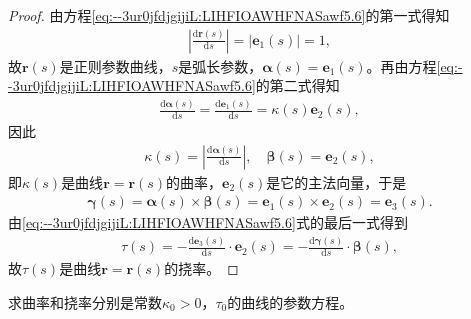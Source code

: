 \documentclass[../../main.tex]{subfiles}%
\begin{document}
\begin{proof}
由方程\eqref{eq:--3ur0jfdjgijiL:LIHFIOAWHFNASawf5.6}的第一式得知
\begin{align*}
\left|\frac{\mathrm{d}\bm{r}(s)}{\mathrm{d}s}\right| = |\bm{e}_1(s)| = 1,
\end{align*}
故$\bm{r}(s)$是正则参数曲线，$s$是弧长参数，$\bm{\alpha}(s) = \bm{e}_1(s)$。再由方程\eqref{eq:--3ur0jfdjgijiL:LIHFIOAWHFNASawf5.6}的第二式得知
\begin{align*}
\frac{\mathrm{d}\bm{\alpha}(s)}{\mathrm{d}s} = \frac{\mathrm{d}\bm{e}_1(s)}{\mathrm{d}s} = \kappa(s)\bm{e}_2(s),
\end{align*}
因此
\begin{align*}
\kappa(s) = \left|\frac{\mathrm{d}\bm{\alpha}(s)}{\mathrm{d}s}\right|,\quad \bm{\beta}(s) = \bm{e}_2(s),
\end{align*}
即$\kappa(s)$是曲线$\bm{r} = \bm{r}(s)$的曲率，$\bm{e}_2(s)$是它的主法向量，于是
\begin{align*}
\bm{\gamma}(s) = \bm{\alpha}(s) \times \bm{\beta}(s) = \bm{e}_1(s) \times \bm{e}_2(s) = \bm{e}_3(s).
\end{align*}
由\eqref{eq:--3ur0jfdjgijiL:LIHFIOAWHFNASawf5.6}式的最后一式得到
\begin{align*}
\tau(s) = -\frac{\mathrm{d}\bm{e}_3(s)}{\mathrm{d}s} \cdot \bm{e}_2(s) = -\frac{\mathrm{d}\bm{\gamma}(s)}{\mathrm{d}s} \cdot \bm{\beta}(s),
\end{align*}
故$\tau(s)$是曲线$\bm{r} = \bm{r}(s)$的挠率。

\end{proof}

\begin{example}
求曲率和挠率分别是常数$\kappa_0 > 0$，$\tau_0$的曲线的参数方程。
\end{example}
\end{document}
